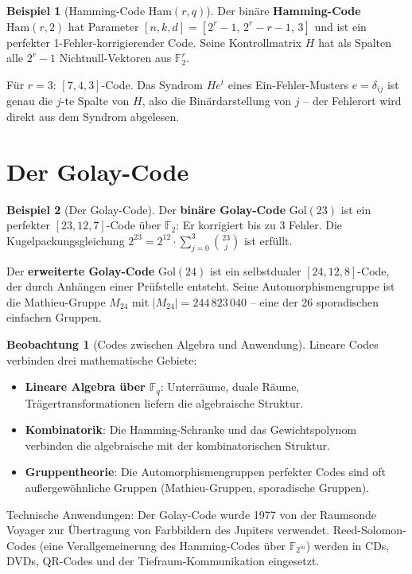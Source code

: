 ﻿\documentclass[a4paper,12pt]{report}
\theoremstyle{definition}
\newtheorem{beispiel}{Beispiel}
\newtheorem{beobachtung}{Beobachtung}
\begin{document}
\begin{beispiel}[Hamming-Code $\mathrm{Ham}(r, q)$]
    Der binäre \textbf{Hamming-Code} $\mathrm{Ham}(r, 2)$ hat Parameter
    $[n, k, d] = [2^r - 1,\, 2^r - r - 1,\, 3]$ und ist ein perfekter
    1-Fehler-korrigierender Code. Seine Kontrollmatrix $H$ hat als Spalten
    alle $2^r - 1$ Nichtnull-Vektoren aus $\mathbb{F}_2^r$.

    Für $r = 3$: $[7, 4, 3]$-Code. Das Syndrom $He^t$ eines
    Ein-Fehler-Musters $e = \delta_{ij}$ ist genau die $j$-te Spalte von $H$,
    also die Binärdarstellung von $j$ -- der Fehlerort wird direkt aus dem
    Syndrom abgelesen.
\end{beispiel}

\section{Der Golay-Code}

\begin{beispiel}[Der Golay-Code]
    Der \textbf{binäre Golay-Code} $\mathrm{Gol}(23)$ ist ein
    perfekter $[23, 12, 7]$-Code über $\mathbb{F}_2$: Er korrigiert
    bis zu $3$ Fehler. Die Kugelpackungsgleichung
    $2^{23} = 2^{12} \cdot \sum_{j=0}^3 \binom{23}{j}$ ist erfüllt.

    Der \textbf{erweiterte Golay-Code} $\mathrm{Gol}(24)$ ist ein
    selbstdualer $[24, 12, 8]$-Code, der durch Anhängen einer Prüfstelle
    entsteht. Seine Automorphismengruppe ist die Mathieu-Gruppe $M_{24}$
    mit $|M_{24}| = 244\,823\,040$ -- eine der 26 sporadischen einfachen
    Gruppen.
\end{beispiel}

\begin{beobachtung}[Codes zwischen Algebra und Anwendung]
    Lineare Codes verbinden drei mathematische Gebiete:
    \begin{itemize}
        \item[-] \textbf{Lineare Algebra über $\mathbb{F}_q$}: Unterräume,
              duale Räume, Trägertransformationen liefern die algebraische Struktur.
        \item[-] \textbf{Kombinatorik}: Die Hamming-Schranke und das
              Gewichtspolynom verbinden die algebraische mit der kombinatorischen Struktur.
        \item[-] \textbf{Gruppen\-theorie}: Die Auto\-morphismen\-gruppen perfekter Codes
              sind oft außer\-ge\-wöhn\-liche Gruppen
              (Mathieu-Gruppen, sporadische Gruppen).
    \end{itemize}

    Technische Anwendungen: Der Golay-Code wurde 1977 von der Raumsonde
    Voyager zur Übertragung von Farbbildern des Jupiters verwendet.
    Reed-Solomon-Codes (eine Verallgemeinerung des Hamming-Codes über
    $\mathbb{F}_{2^m}$) werden in CDs, DVDs, QR-Codes und der
    Tief\-raum-Kommunikation eingesetzt.
\end{beobachtung}
\end{document}
